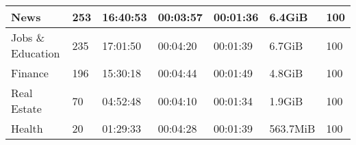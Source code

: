 \begin{table}[]
\begin{tabular}{l|l|l|l|l|l|l}
News                                               & 253                                                 & 16:40:53                                                 & 00:03:57                                                & 00:01:36                                               & 6.4GiB                                               & 100                                                           \\ \hline
Jobs \& Education                                  & 235                                                 & 17:01:50                                                 & 00:04:20                                                & 00:01:39                                               & 6.7GiB                                               & 100                                                           \\ \hline
Finance                                            & 196                                                 & 15:30:18                                                 & 00:04:44                                                & 00:01:49                                               & 4.8GiB                                               & 100                                                           \\ \hline
Real Estate                                        & 70                                                  & 04:52:48                                                 & 00:04:10                                                & 00:01:34                                               & 1.9GiB                                               & 100                                                           \\ \hline
Health                                             & 20                                                  & 01:29:33                                                 & 00:04:28                                                & 00:01:39                                               & 563.7MiB                                             & 100                                                          
\end{tabular}
\label{tab:yt-granular}
\end{table}


